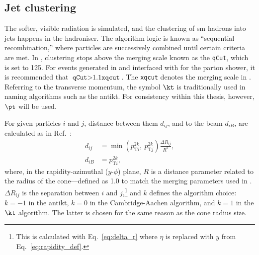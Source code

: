 

\subsection{Jet clustering}
\label{subsec:svj_pythia_jet_clustering}

The softer, visible radiation is simulated, and the clustering of \acrshort{sm} hadrons into \glspl{jet} happens in the hadroniser. The algorithm logic is known as ``sequential recombination,'' where particles are successively combined until certain criteria are met. In \PYTHIA, clustering stops above the merging scale known as the \texttt{qCut}, which is set to 125\GeV. For events generated in \MADGRAPH and interfaced with \PYTHIA for the parton shower, it is recommended that $\texttt{qCut} > \text{1.1} \texttt{xqcut}$. The \texttt{xqcut} denotes the merging scale in \MADGRAPH. Referring to the transverse momentum, the symbol $\kt$ is traditionally used in naming algorithms such as the \gls{antikt}. For consistency within this thesis, however, $\pt$ will be used.


For given particles $i$ and $j$, distance between them $d_{ij}$, and to the beam $d_{iB}$, are calculated as in Ref.~:
\begin{equation}
    \begin{aligned}
d_{ij} &= \min(p_{\mathrm{T}i}^{2k}, \ p_{\mathrm{T}j}^{2k}) \frac{\Delta R_{ij}}{R^2},\\
d_{iB} &= p_{\mathrm{T}i}^{2k},
    \end{aligned}
    \label{eq:distances_kt_pythia}
\end{equation}
where, in the rapidity-azimuthal ($y$-$\phi$) plane, $R$ is a distance parameter related to the radius of the cone---defined as 1.0 to match the merging parameters used in \MADGRAPH. $\Delta R_{ij}$ is the separation between $i$ and $j$,\footnote{This is calculated with Eq.~\ref{eq:delta_r} where $\eta$ is replaced with $y$ from Eq.~\ref{eq:rapidity_def}.} and $k$ defines the algorithm choice: $k = -\text{1}$ in the \gls{antikt}, $k = \text{0}$ in the Cambridge-Aachen algorithm, and $k = \text{1}$ in the $\kt$ algorithm. The latter is chosen for the same reason as the cone radius size.

